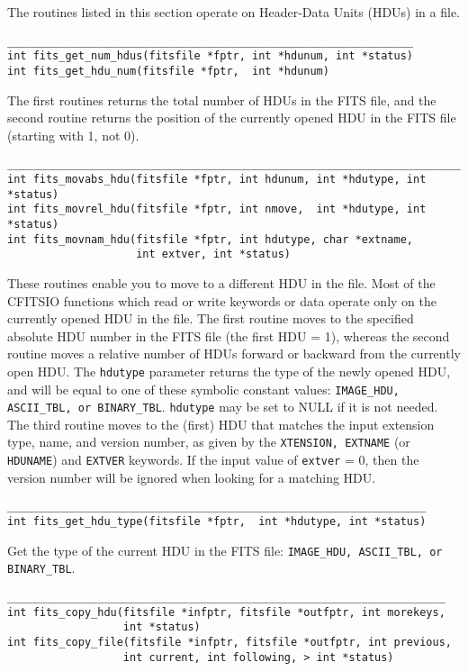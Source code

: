 \documentclass[11pt]{article}
\begin{document}
The routines listed in this section operate on Header-Data Units (HDUs) in a file.

\begin{verbatim}
_______________________________________________________________
int fits_get_num_hdus(fitsfile *fptr, int *hdunum, int *status)
int fits_get_hdu_num(fitsfile *fptr,  int *hdunum)
\end{verbatim}

The first routines returns the total number of HDUs in the FITS file,
and the second routine returns the position of the currently opened HDU in
the FITS file (starting with 1, not 0).

\begin{verbatim}
__________________________________________________________________________
int fits_movabs_hdu(fitsfile *fptr, int hdunum, int *hdutype, int *status)
int fits_movrel_hdu(fitsfile *fptr, int nmove,  int *hdutype, int *status)
int fits_movnam_hdu(fitsfile *fptr, int hdutype, char *extname,
                    int extver, int *status)
\end{verbatim}

These routines enable you to move to a different HDU in the file.
Most of the CFITSIO functions which read or write keywords or data
operate only on the currently opened HDU in the file.  The first
routine moves to the specified absolute HDU number in the FITS
file (the first HDU = 1), whereas the second routine moves a relative
number of HDUs forward or backward from the currently open HDU.  The
{\tt hdutype} parameter returns the type of the newly opened HDU, and will
be equal to one of these symbolic constant values: {\tt IMAGE\_HDU,
ASCII\_TBL, or BINARY\_TBL}.  {\tt hdutype} may be set to NULL
if it is not needed.  The third routine moves to the (first) HDU
that matches the input extension type, name, and version number,
as given by the {\tt XTENSION, EXTNAME} (or {\tt HDUNAME}) and {\tt EXTVER} keywords.
If the input value of {\tt extver} = 0, then the version number will
be ignored when looking for a matching HDU.

\begin{verbatim}
_________________________________________________________________
int fits_get_hdu_type(fitsfile *fptr,  int *hdutype, int *status)
\end{verbatim}

Get the type of the current HDU in the FITS file:  {\tt IMAGE\_HDU,
ASCII\_TBL, or BINARY\_TBL}.

\begin{verbatim}
____________________________________________________________________
int fits_copy_hdu(fitsfile *infptr, fitsfile *outfptr, int morekeys,
                  int *status)
int fits_copy_file(fitsfile *infptr, fitsfile *outfptr, int previous,
                  int current, int following, > int *status)
\end{verbatim}
\end{document}
